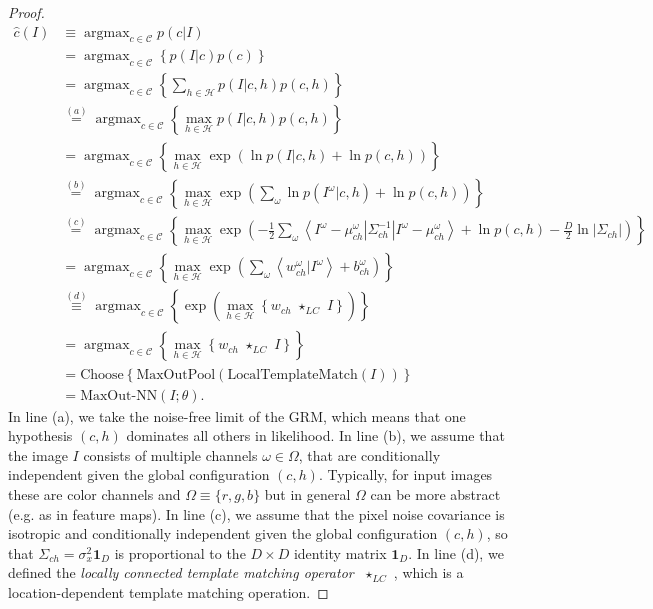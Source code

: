 \documentclass[12pt]{article}
\DeclareMathOperator*{\argmax}{argmax}
\newcommand{\Cl}[0]{{ \mathcal{C} }}
\newcommand{\HH}[0]{{ \mathcal{H} }}
\newcommand{\lcmatch}[0]{{ \,\,\star_{LC}\,\, }}
\begin{document}
\begin{proof}
\begin{align*}
	\hat{c}(I)                 &\equiv \argmax_{c \in \Cl} p(c|I) \\
	                               &= \argmax_{c \in \Cl} \left\{ p(I | c)  p(c) \right\} \\
	                               &= \argmax_{c \in \Cl} \left\{ \sum_{h \in \HH} p(I | c,h)  p(c,h) \right\} \\
	                               &\overset{(a)}{=} \argmax_{c \in \Cl} \left\{ \max_{h \in \HH} p(I | c,h)  p(c,h) \right\} \\
	                               &= \argmax_{c \in \Cl} \left\{ \max_{h \in \HH} \exp \left( \ln p(I | c,h)  + \ln p(c,h) \right) \right\} \\
	                               &\overset{(b)}{=} \argmax_{c \in \Cl} \left\{ \max_{h \in \HH} \exp \left( \sum_{\omega} \ln p(I^{\omega} | c,h)  + \ln p(c,h) \right) \right\} \\
	                               &\overset{(c)}{=} \argmax_{c \in \Cl} \left\{ \max_{h \in \HH} \exp \left( -\frac{1}{2} \sum_{\omega} \left< I^{\omega} - \mu_{ch}^{\omega} | \Sigma^{-1}_{ch} | I^{\omega} - \mu_{ch}^{\omega} \right>  + \ln p(c,h) -\frac{D}{2} \ln |\Sigma_{ch}| \right) \right\} \\
	                               &= \argmax_{c \in \Cl} \left\{ \max_{h \in \HH} \exp \left( \sum_{\omega} \left< w_{ch}^{\omega} | I^{\omega} \right>  + b_{ch}^{\omega} \right) \right\} \\
	                               &\overset{(d)}{\equiv} \argmax_{c \in \Cl} \left\{ \exp \left( \max_{h \in \HH}  \left\{ w_{ch} \lcmatch I \right\}  \right) \right\} \\
	                               &= \argmax_{c \in \Cl} \left\{ \max_{h \in \HH}  \left\{ w_{ch} \lcmatch I \right\} \right\} \\	                               
	                               &= \textrm{Choose} \left\{ \textrm{MaxOutPool}(  \textrm{LocalTemplateMatch} (I))  \right\} \\
	                               &= \textrm{MaxOut-NN}(I; \theta).
\end{align*}
In line (a), we take the noise-free limit of the GRM, which means that one hypothesis $(c,h)$ dominates all others in likelihood. In line (b), we assume that the image $I$ consists of multiple channels $\omega \in \Omega$, that are conditionally independent given the global configuration $(c,h)$. Typically, for input images these are color channels and $\Omega \equiv \{ r,g,b \}$ but in general $\Omega$ can be more abstract (e.g. as in feature maps). In line (c), we assume that the pixel noise covariance is isotropic and conditionally independent given the global configuration $(c,h)$, so that $\Sigma_{ch} = \sigma_{x}^{2} \mathbf{1}_{D} $ is proportional to the $D \times D$ identity matrix $\mathbf{1}_{D}$. In line (d), we defined the \emph{locally connected template matching operator} $\lcmatch$, which is a location-dependent template matching operation.
\end{proof}
\end{document}
